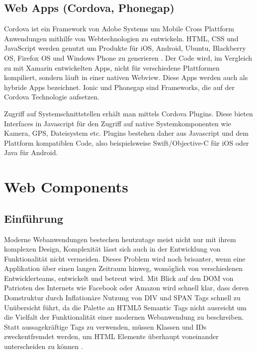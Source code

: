 \newpage


\subsection{Web Apps (Cordova, Phonegap)}

Cordova ist ein Framework von Adobe Systems um Mobile Cross Plattform Anwendungen mithilfe von Webtechnologien zu entwickeln.
HTML, CSS und JavaScript werden genutzt um Produkte für iOS, Android, Ubuntu, Blackberry OS, Firefox OS und Windows Phone zu generieren \cite{Cordo26:online}.
Der Code wird, im Vergleich zu mit Xamarin entwickelten Apps, nicht für verschiedene Plattformen kompiliert,
sondern läuft in einer nativen Webview. Diese Apps werden auch als hybride Apps bezeichnet.
Ionic und Phonegap sind Frameworks, die auf der Cordova Technologie aufsetzen.

Zugriff auf Systemschnittstellen erhält man mittels Cordova Plugins. Diese bieten
Interfaces in Javascript für den Zugriff auf native Systemkomponenten wie Kamera, GPS, Dateisystem etc.
Plugins bestehen daher aus Javascript und dem Plattform kompatiblen Code,
also beispielsweise Swift/Objective-C für iOS oder Java für Android.

\vspace{1cm}

\vspace{1cm}

\newpage
\section{Web Components}


\subsection{Einführung}

Moderne Webanwendungen bestechen heutzutage meist nicht nur mit ihrem komplexen Design, Komplexität lässt sich auch in der Entwicklung
von Funktionalität nicht vermeiden. Dieses Problem wird noch brisanter, wenn eine Applikation über einen langen Zeitraum hinweg,
womöglich von verschiedenen Entwicklerteams, entwickelt und betreut wird. Mit Blick auf den \ac{DOM} von Patrioten des Internets wie Facebook oder Amazon
wird schnell klar, dass deren Domstruktur durch Inflationäre Nutzung von DIV und SPAN Tags schnell zu Unübersicht führt,
da die Palette an HTML5 Semantic Tags nicht ausreicht um die Vielfalt der Funktionalität einer modernen Webanwendung zu beschreiben.
Statt aussagekräftige Tags zu verwenden, müssen Klassen und IDs zweckentfremdet werden, um HTML Elemente überhaupt voneinander unterscheiden zu können
\cite{sitepoint-introduction-to-webcomponents}.

